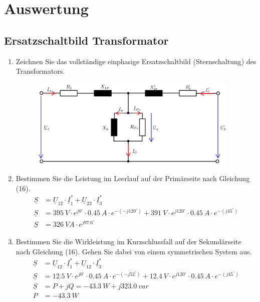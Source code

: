 \section{Auswertung}
\subsection{Ersatzschaltbild Transformator}
\begin{enumerate}[label=\alph*)]
	\item Zeichnen Sie das vollständige einphasige Ersatzschaltbild (Sternschaltung) des
	      Transformators.
	      \begin{figure}[h!]
		      \begin{center}
			      \includegraphics[width=0.95\textwidth]{img/4.1.1.1}
		      \end{center}
		      \caption{}\label{img:4.1.1.1}
	      \end{figure}

	\item Bestimmen Sie die Leistung im Leerlauf auf der Primärseite nach Gleichung (16).
	      \begin{align*}
		      \underline S & = \underline U_{12} \cdot \underline I_1^* + \underline U_{23}\cdot \underline I_3^*                                                 \\
		      \underline S & = 395\ V \cdot e^{j0^\circ} \cdot 0.45\ A \cdot e^{-(-j120^\circ)} + 391\ V \cdot e^{j120^\circ}\cdot 0.45\ A \cdot e^{-(j45^\circ)} \\
		      \underline S & = 326\ VA\cdot e^{j97.6^\circ}
	      \end{align*}

	\item Bestimmen Sie die Wirkleistung im Kurzschlussfall auf der Sekundärseite nach
	      Gleichung (16). Gehen Sie dabei von einem symmetrischen System aus.
	      \begin{align*}
		      \underline S & = \underline U_{12} \cdot \underline I_1^* + \underline U_{12}\cdot \underline I_3^*                                                  \\
		      \underline S & = 12.5\ V \cdot e^{j0^\circ} \cdot 0.45\ A \cdot e^{-(-j52^\circ)} + 12.4\ V \cdot e^{j120^\circ}\cdot 0.45\ A \cdot e^{-(j45^\circ)} \\
		      \underline S & = P + jQ = -43.3\ W +j 323.0\ var                                                                                                     \\
		      P            & = -43.3\ W
	      \end{align*}


\end{enumerate}
